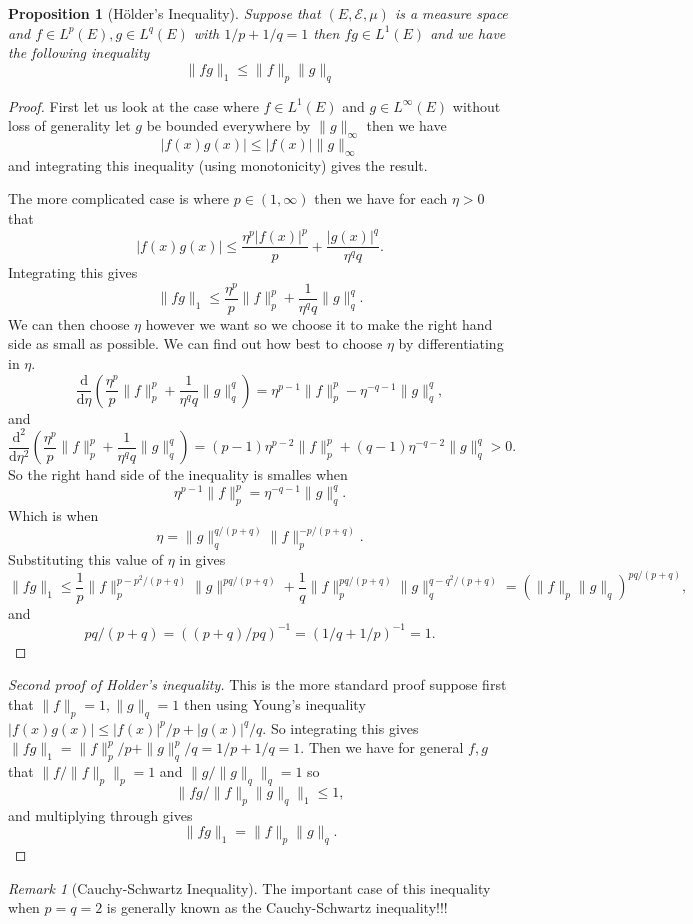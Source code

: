 \documentclass[11pt]{article}
\newtheorem{prp}[thm]{Proposition}
\theoremstyle{definition}
\theoremstyle{remark}
\newtheorem{remark}[thm]{Remark}
\begin{document}
\begin{prp}[H\"older's Inequality]
Suppose that $(E, \mathcal{E}, \mu)$ is a measure space and $f \in L^p(E), g \in L^q(E)$ with $1/p+1/q =1$ then $fg \in L^1(E)$ and we have the following inequality
\[ \|fg\|_1 \leq  \|f\|_p \|g\|_q \]
\end{prp}
\begin{proof}
First let us look at the case where $f \in L^1(E)$ and $g \in L^\infty(E)$ without loss of generality let $g$ be bounded everywhere by $\|g\|_\infty$ then we have
\[ |f(x)g(x)| \leq |f(x)| \|g\|_\infty \] and integrating this inequality (using monotonicity) gives the result.

The more complicated case is where $p \in (1, \infty)$  then we have for each $\eta >0$ that
\[ |f(x)g(x)| \leq \frac{\eta^p |f(x)|^p}{p} + \frac{|g(x)|^q}{\eta^q q}. \] Integrating this gives
\[ \|fg\|_1 \leq \frac{\eta^p}{p} \|f\|_p^p + \frac{1}{\eta^q q} \|g\|_q^q. \] We can then choose $\eta$ however we want so we choose it to make the right hand side as small as possible. We can find out how best to choose $\eta$ by differentiating in $\eta$.
\[ \frac{\mathrm{d}}{\mathrm{d}\eta} \left(\frac{\eta^p}{p} \|f\|_p^p + \frac{1}{\eta^q q} \|g\|_q^q\right) = \eta^{p-1} \|f\|_p^p - \eta^{-q-1} \|g\|_q^q, \] and
\[ \frac{\mathrm{d}^2}{\mathrm{d}\eta^2} \left(\frac{\eta^p}{p} \|f\|_p^p + \frac{1}{\eta^q q} \|g\|_q^q\right) = (p-1) \eta^{p-2} \|f\|_p^p + (q-1) \eta^{-q-2} \|g\|_q^q>0.\] So the right hand side of the inequality is smalles when
\[\eta^{p-1} \|f\|_p^p = \eta^{-q-1} \|g\|_q^q.  \] Which is when
\[ \eta = \|g\|_q^{q/(p+q)} \|f\|_p^{-p/(p+q)}. \] Substituting this value of $\eta$ in gives
\[ \|fg\|_1 \leq \frac{1}{p} \|f\|_p^{p-p^2/(p+q)} \|g\|^{pq/(p+q)} + \frac{1}{q} \|f\|^{pq/(p+q)}_p \|g\|_q^{q-q^2/(p+q)} = \left(\|f\|_p \|g\|_q \right)^{pq/(p+q)},\] and
\[ pq/(p+q) = \left( (p+q)/pq \right)^{-1} = \left( 1/q + 1/p \right)^{-1} = 1. \]
\end{proof}
\begin{proof}[Second proof of Holder's inequality]
This is the more standard proof suppose first that $\|f\|_p =1, \|g\|_q = 1$ then using Young's inequality $|f(x)g(x)| \leq |f(x)|^p/p + |g(x)|^q/q$. So integrating this gives $\|fg\|_1 = \|f\|^p_p/p + \|g\|^p_q/q = 1/p + 1/q = 1$. Then we have for general $f,g$ that $\|f/\|f\|_p\|_p = 1$ and $\|g/\|g\|_q\|_q = 1$ so
\[ \| fg/ \|f\|_p \|g\|_q\|_1 \leq 1,  \] and multiplying through gives
\[ \|fg\|_1 = \|f\|_p \|g\|_q.\]
\end{proof}
\begin{remark}[Cauchy-Schwartz Inequality]
The important case of this inequality when $p=q=2$ is generally known as the Cauchy-Schwartz inequality!!!
\end{remark}
\end{document}
